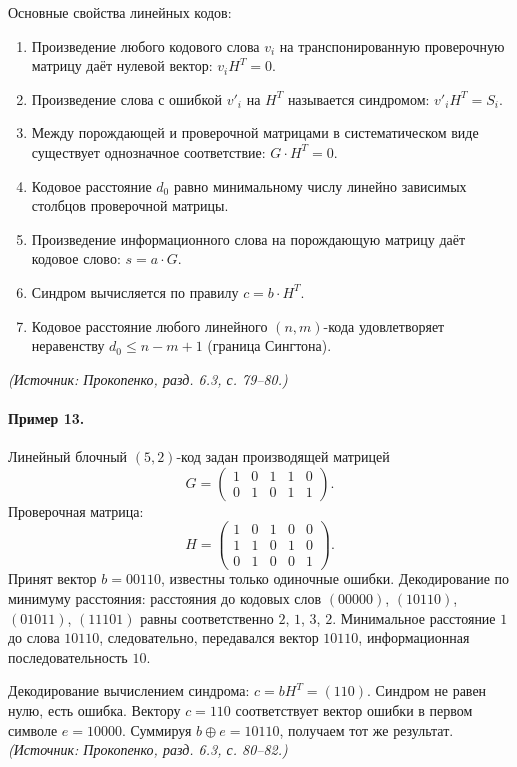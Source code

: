 \documentclass[a4paper,12pt]{article}
\begin{document}
Основные свойства линейных кодов:
\begin{enumerate}[label=\arabic*)]
\item Произведение любого кодового слова \(v_i\) на транспонированную проверочную матрицу даёт нулевой вектор: \(v_iH^T=0\).
\item Произведение слова с ошибкой \(v'_i\) на \(H^T\) называется синдромом: \(v'_iH^T=S_i\).
\item Между порождающей и проверочной матрицами в систематическом виде существует однозначное соответствие: \(G\cdot H^T=0\).
\item Кодовое расстояние \(d_0\) равно минимальному числу линейно зависимых столбцов проверочной матрицы.
\item Произведение информационного слова на порождающую матрицу даёт кодовое слово: \(s=a\cdot G\).
\item Синдром вычисляется по правилу \(c=b\cdot H^T\).
\item Кодовое расстояние любого линейного \((n,m)\)-кода удовлетворяет неравенству \(d_0\le n-m+1\) (граница Сингтона).
\end{enumerate}
\textit{(Источник: Прокопенко, разд. 6.3, с. 79--80.)}

\paragraph{Пример 13.}
Линейный блочный \((5,2)\)-код задан производящей матрицей
\[
G=\begin{pmatrix}1&0&1&1&0\\0&1&0&1&1\end{pmatrix}.
\]
Проверочная матрица:
\[
H=\begin{pmatrix}1&0&1&0&0\\1&1&0&1&0\\0&1&0&0&1\end{pmatrix}.
\]
Принят вектор \(b=00110\), известны только одиночные ошибки. Декодирование по минимуму расстояния: расстояния до кодовых слов \((00000)\), \((10110)\), \((01011)\), \((11101)\) равны соответственно \(2\), \(1\), \(3\), \(2\). Минимальное расстояние \(1\) до слова \(10110\), следовательно, передавался вектор \(10110\), информационная последовательность \(10\).

Декодирование вычислением синдрома: \(c=bH^T=(110)\). Синдром не равен нулю, есть ошибка. Вектору \(c=110\) соответствует вектор ошибки в первом символе \(e=10000\). Суммируя \(b\oplus e=10110\), получаем тот же результат.
\textit{(Источник: Прокопенко, разд. 6.3, с. 80--82.)}
\end{document}
